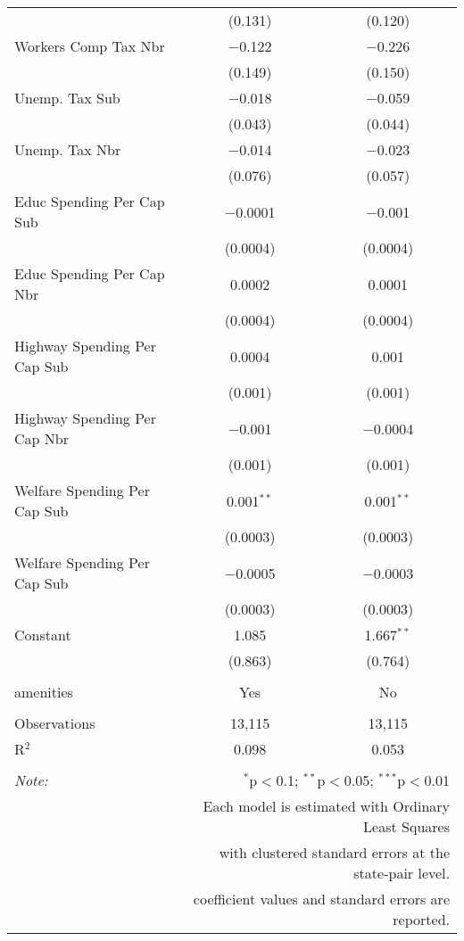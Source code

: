 \begin{table}[!htbp]
\begin{tabular}{@{\extracolsep{5pt}}lcc}
  & (0.131) & (0.120) \\ 
  Workers Comp Tax Nbr & $-$0.122 & $-$0.226 \\ 
  & (0.149) & (0.150) \\ 
  Unemp. Tax Sub & $-$0.018 & $-$0.059 \\ 
  & (0.043) & (0.044) \\ 
  Unemp. Tax Nbr & $-$0.014 & $-$0.023 \\ 
  & (0.076) & (0.057) \\ 
  Educ Spending Per Cap Sub & $-$0.0001 & $-$0.001 \\ 
  & (0.0004) & (0.0004) \\ 
  Educ Spending Per Cap Nbr & 0.0002 & 0.0001 \\ 
  & (0.0004) & (0.0004) \\ 
  Highway Spending Per Cap Sub & 0.0004 & 0.001 \\ 
  & (0.001) & (0.001) \\ 
  Highway Spending Per Cap Nbr & $-$0.001 & $-$0.0004 \\ 
  & (0.001) & (0.001) \\ 
  Welfare Spending Per Cap Sub & 0.001$^{**}$ & 0.001$^{**}$ \\ 
  & (0.0003) & (0.0003) \\ 
  Welfare Spending Per Cap Sub & $-$0.0005 & $-$0.0003 \\ 
  & (0.0003) & (0.0003) \\ 
  Constant & 1.085 & 1.667$^{**}$ \\ 
  & (0.863) & (0.764) \\ 
 \hline \\[-1.8ex] 
amenities & Yes & No \\ 
\hline \\[-1.8ex] 
Observations & 13,115 & 13,115 \\ 
R$^{2}$ & 0.098 & 0.053 \\ 
\hline 
\hline \\[-1.8ex] 
\textit{Note:}  & \multicolumn{2}{r}{$^{*}$p$<$0.1; $^{**}$p$<$0.05; $^{***}$p$<$0.01} \\ 
 & \multicolumn{2}{r}{Each model is estimated with Ordinary Least Squares} \\ 
 & \multicolumn{2}{r}{with clustered standard errors at the state-pair level.} \\ 
 & \multicolumn{2}{r}{coefficient values and standard errors are reported.} \\ 
\end{tabular} 
\end{table} 
